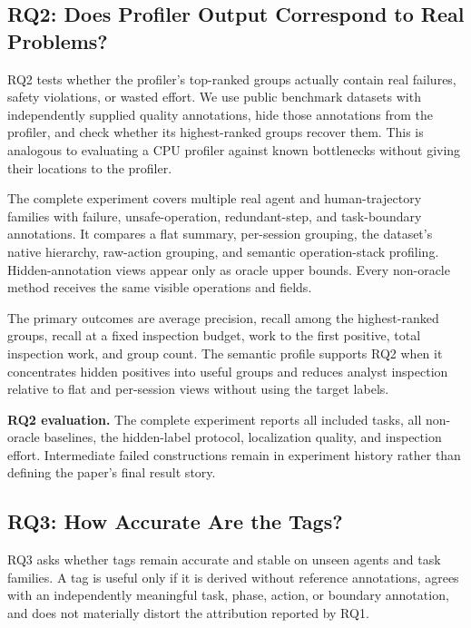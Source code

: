 \documentclass[letterpaper]{article}
\begin{document}
\subsection{RQ2: Does Profiler Output Correspond to Real Problems?}

RQ2 tests whether the profiler's top-ranked groups actually contain real
failures, safety violations, or wasted effort. We use public benchmark datasets
with independently supplied quality annotations, hide those annotations from
the profiler, and check whether its highest-ranked groups recover them. This is
analogous to evaluating a CPU profiler against known bottlenecks without giving
their locations to the profiler.

The complete experiment covers multiple real agent and human-trajectory
families with failure, unsafe-operation, redundant-step, and task-boundary
annotations. It compares a flat summary, per-session grouping, the dataset's
native hierarchy, raw-action grouping, and semantic operation-stack profiling.
Hidden-annotation views appear only as oracle upper bounds. Every non-oracle
method receives the same visible operations and fields.

The primary outcomes are average precision, recall among the highest-ranked
groups, recall at a fixed inspection budget, work to the first positive, total
inspection work, and group count. The semantic profile supports RQ2 when it
concentrates hidden positives into useful groups and reduces analyst inspection
relative to flat and per-session views without using the target labels.

\textbf{RQ2 evaluation.} The complete experiment reports all included tasks,
all non-oracle baselines, the hidden-label protocol, localization quality, and
inspection effort. Intermediate failed constructions remain in experiment
history rather than defining the paper's final result story.

\subsection{RQ3: How Accurate Are the Tags?}
\label{sec:rq3}

RQ3 asks whether tags remain accurate and stable on unseen agents and task
families. A tag is useful only if it is derived without reference
annotations, agrees with an independently meaningful task, phase, action, or
boundary annotation, and does not materially distort the attribution
reported by RQ1.
\end{document}
